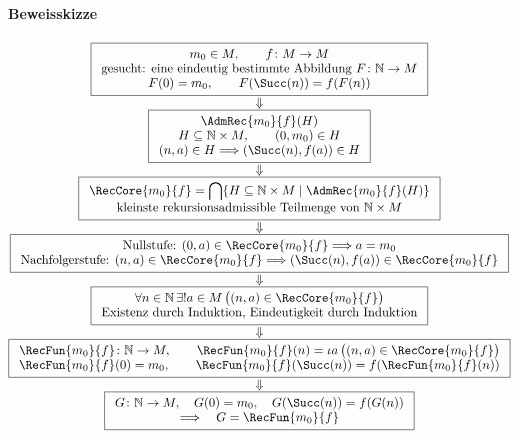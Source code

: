\documentclass[main.tex]{subfiles}
\begin{document}
\paragraph{Beweisskizze}

\begingroup
\footnotesize
\[
\begin{array}{@{}c@{}}
\boxed{
\begin{array}{c}
m_0\in M,\qquad f\colon M\to M
\\[-.1ex]
\text{gesucht: eine eindeutig bestimmte Abbildung }
F\colon\mathbb{N}\to M
\\[-.1ex]
F(0)=m_0,\qquad F(\Succ(n))=f(F(n))
\end{array}}
\\[1.1ex]
\Downarrow
\\[-.2ex]
\boxed{
\begin{array}{c}
\AdmRec{m_0}{f}(H)
\\[-.1ex]
H\subseteq\mathbb{N}\times M,\qquad
(0,m_0)\in H
\\[-.1ex]
(n,a)\in H\Longrightarrow(\Succ(n),f(a))\in H
\end{array}}
\\[1.1ex]
\Downarrow
\\[-.2ex]
\boxed{
\begin{array}{c}
\RecCore{m_0}{f}
=
\displaystyle\bigcap\{H\subseteq\mathbb{N}\times M
\mid \AdmRec{m_0}{f}(H)\}
\\[-.1ex]
\text{kleinste rekursionsadmissible Teilmenge von }
\mathbb{N}\times M
\end{array}}
\\[1.1ex]
\Downarrow
\\[-.2ex]
\boxed{
\begin{array}{c}
\text{Nullstufe: }(0,a)\in\RecCore{m_0}{f}
\Longrightarrow a=m_0
\\[-.1ex]
\text{Nachfolgerstufe: }(n,a)\in\RecCore{m_0}{f}
\Longrightarrow
(\Succ(n),f(a))\in\RecCore{m_0}{f}
\end{array}}
\\[1.1ex]
\Downarrow
\\[-.2ex]
\boxed{
\begin{array}{c}
\forall n\in\mathbb{N}\,\exists!a\in M\,
\bigl((n,a)\in\RecCore{m_0}{f}\bigr)
\\[-.1ex]
\text{Existenz durch Induktion, Eindeutigkeit durch Induktion}
\end{array}}
\\[1.1ex]
\Downarrow
\\[-.2ex]
\boxed{
\begin{array}{c}
\RecFun{m_0}{f}\colon\mathbb{N}\to M,
\qquad
\RecFun{m_0}{f}(n)
=
\iota a\,\bigl((n,a)\in\RecCore{m_0}{f}\bigr)
\\[-.1ex]
\RecFun{m_0}{f}(0)=m_0,\qquad
\RecFun{m_0}{f}(\Succ(n))=f(\RecFun{m_0}{f}(n))
\end{array}}
\\[1.1ex]
\Downarrow
\\[-.2ex]
\boxed{
\begin{array}{c}
G\colon\mathbb{N}\to M,\quad
G(0)=m_0,\quad
G(\Succ(n))=f(G(n))
\\[-.1ex]
\Longrightarrow\quad
G=\RecFun{m_0}{f}
\end{array}}
\end{array}
\]
\endgroup
\end{document}
